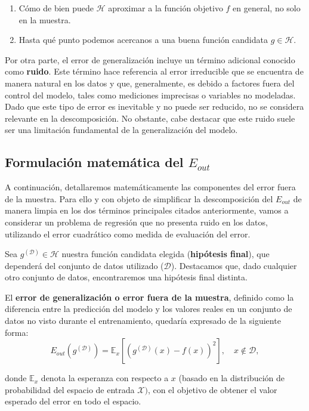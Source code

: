 \begin{enumerate}
    \item Cómo de bien puede $\mathcal{H}$ aproximar a la función objetivo $f$ en general, no solo en la muestra.
    \item Hasta qué punto podemos acercanos a una buena función candidata $g \in \mathcal{H}$.
\end{enumerate}

Por otra parte, el error de generalización incluye un término adicional conocido como \textbf{ruido}. Este término hace referencia al error irreducible que se encuentra de manera natural en los datos y que, generalmente, es debido a factores fuera del control del modelo, tales como mediciones imprecisas o variables no modeladas. Dado que este tipo de error es inevitable y no puede ser reducido, no se considera relevante en la descomposición. No obstante, cabe destacar que este ruido suele ser una limitación fundamental de la generalización del modelo.

\subsection{Formulación matemática del $E_{out}$}\label{sec:formulacion-matematica-Eout}
A continuación, detallaremos matemáticamente las componentes del error fuera de la muestra. Para ello y con objeto de simplificar la descomposición del $E_{out}$ de manera limpia en los dos términos principales citados anteriormente, vamos a considerar un problema de regresión que no presenta ruido en los datos, utilizando el error cuadrático como medida de evaluación del error.

Sea $g^{\mathcal{(D)}} \in \mathcal{H}$ nuestra función candidata elegida (\textbf{hipótesis final}), que dependerá del conjunto de datos utilizado ($\mathcal{D}$). Destacamos que, dado cualquier otro conjunto de datos, encontraremos una hipótesis final distinta.

El \textbf{error de generalización o error fuera de la muestra}, definido como la diferencia entre la predicción del modelo y los valores reales en un conjunto de datos no visto durante el entrenamiento, quedaría expresado de la siguiente forma:
\begin{equation}\label{eq:E_out1}
    E_{out}(g^{\mathcal{(D)}}) = \mathbb{E}_{x}[{(g^{\mathcal{(D)}}(x) - f(x))}^2], \quad x \notin \mathcal{D},
\end{equation}

donde $\mathbb{E}_{x}$ denota la esperanza con respecto a $x$ (basado en la distribución de probabilidad del espacio de entrada $\mathcal{X})$, con el objetivo de obtener el valor esperado del error en todo el espacio.

